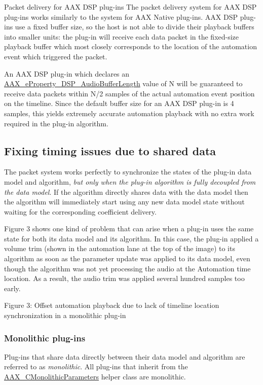 \begin{DoxyParagraph}{Packet delivery for A\+AX D\+SP plug-\/ins}
The packet delivery system for A\+AX D\+SP plug-\/ins works similarly to the system for A\+AX Native plug-\/ins. A\+AX D\+SP plug-\/ins use a fixed buffer size, so the host is not able to divide their playback buffers into smaller units\+: the plug-\/in will receive each data packet in the fixed-\/size playback buffer which most closely corresponds to the location of the automation event which triggered the packet.

An A\+AX D\+SP plug-\/in which declares an \mbox{\hyperlink{a00662_a13e384f22825afd3db6d68395b79ce0da09fbd1cbcae0e86ad81005258dc1b67e}{A\+A\+X\+\_\+e\+Property\+\_\+\+D\+S\+P\+\_\+\+Audio\+Buffer\+Length}} value of N will be guaranteed to receive data packets within N/2 samples of the actual automation event position on the timeline. Since the default buffer size for an A\+AX D\+SP plug-\/in is 4 samples, this yields extremely accurate automation playback with no extra work required in the plug-\/in algorithm. 
\end{DoxyParagraph}
\hypertarget{a00821_parameterUpdateTiming_sharedData}{}\subsection{Fixing timing issues due to shared data}\label{a00821_parameterUpdateTiming_sharedData}
The packet system works perfectly to synchronize the states of the plug-\/in data model and algorithm, {\itshape but only when the plug-\/in algorithm is fully decoupled from the data model}. If the algorithm directly shares data with the data model then the algorithm will immediately start using any new data model state without waiting for the corresponding coefficient delivery.

Figure 3 shows one kind of problem that can arise when a plug-\/in uses the same state for both its data model and its algorithm. In this case, the plug-\/in applied a volume trim (shown in the automation lane at the top of the image) to its algorithm as soon as the parameter update was applied to its data model, even though the algorithm was not yet processing the audio at the Automation time location. As a result, the audio trim was applied several hundred samples too early.

 Figure 3\+: Offset automation playback due to lack of timeline location synchronization in a monolithic plug-\/in\hypertarget{a00821_parameterUpdateTiming_monolithic}{}\subsubsection{Monolithic plug-\/ins}\label{a00821_parameterUpdateTiming_monolithic}
Plug-\/ins that share data directly between their data model and algorithm are referred to as {\itshape monolithic}. All plug-\/ins that inherit from the \mbox{\hyperlink{a01969}{A\+A\+X\+\_\+\+C\+Monolithic\+Parameters}} helper class are monolithic.

